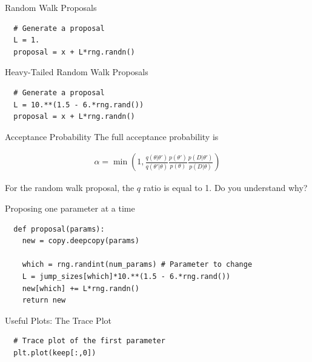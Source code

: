 \begin{frame}[t, fragile]{Random Walk Proposals}
\begin{verbatim}
  # Generate a proposal
  L = 1.
  proposal = x + L*rng.randn()
\end{verbatim}
\end{frame}

\begin{frame}[t, fragile]{Heavy-Tailed Random Walk Proposals}
\begin{verbatim}
  # Generate a proposal
  L = 10.**(1.5 - 6.*rng.rand())
  proposal = x + L*rng.randn()
\end{verbatim}
\end{frame}


\begin{frame}[t]{Acceptance Probability}
The full acceptance probability is

\begin{eqnarray}
\alpha =
\min\left(1, \frac{q(\theta|\theta')}{q(\theta'|\theta)}\frac{p(\theta')}{p(\theta)}\frac{p(D|\theta')}{p(D|\theta)}\right)
\end{eqnarray}

For the random walk proposal, the $q$ ratio is equal to 1. Do you understand
why?
\end{frame}

\begin{frame}[t, fragile]{Proposing one parameter at a time}
\begin{verbatim}
  def proposal(params):
    new = copy.deepcopy(params)

    which = rng.randint(num_params) # Parameter to change
    L = jump_sizes[which]*10.**(1.5 - 6.*rng.rand())
    new[which] += L*rng.randn()
    return new
\end{verbatim}
\end{frame}



\begin{frame}[t, fragile]{Useful Plots: The Trace Plot}
\begin{verbatim}
  # Trace plot of the first parameter
  plt.plot(keep[:,0])
\end{verbatim}
\end{frame}

